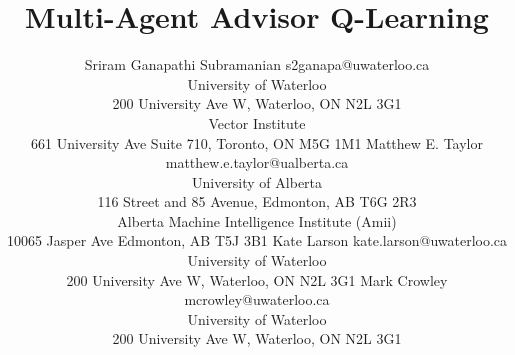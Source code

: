 \documentclass[jair, twoside,11pt,theapa]{article}
\begin{document}
\title{Multi-Agent Advisor Q-Learning}

\author{\name Sriram Ganapathi Subramanian \email s2ganapa@uwaterloo.ca \\
\addr University of Waterloo \\ 200 University Ave W, Waterloo, ON  N2L 3G1 \\
Vector Institute \\ 661 University Ave Suite 710, Toronto, ON M5G 1M1
       \AND
       \name Matthew E. Taylor \email matthew.e.taylor@ualberta.ca \\
       \addr University of Alberta \\ 
       116 Street and 85 Avenue, 
       Edmonton, AB  T6G 2R3  \\
       Alberta Machine Intelligence Institute (Amii) \\
       10065 Jasper Ave Edmonton, AB T5J 3B1 
       \AND
       \name Kate Larson \email kate.larson@uwaterloo.ca \\
       \addr University of Waterloo \\ 
       200 University Ave W, Waterloo, ON  N2L 3G1  
       \AND
       \name Mark Crowley \email mcrowley@uwaterloo.ca \\
       \addr University of Waterloo \\ 
       200 University Ave W, Waterloo,
       ON  N2L 3G1}


\maketitle
\end{document}
